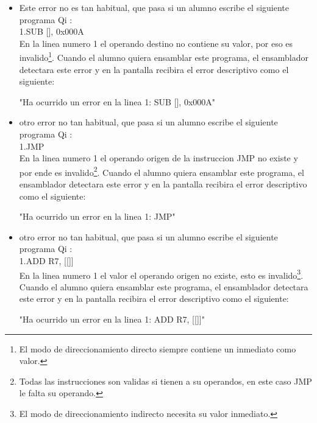 \begin{itemize}
"Ha ocurrido un error en la linea 1: ZDD [0x900000000000], R4" \\

\item Este error no es tan habitual, que pasa si un alumno escribe el siguiente programa Qi  :\\

1.SUB [], 0x000A \\

En la linea numero 1 el operando destino no contiene su valor, por eso es invalido\footnote{El modo de direccionamiento directo siempre contiene un inmediato como valor.}. Cuando el alumno quiera ensamblar este programa, el ensamblador detectara este error y en la pantalla recibira el error descriptivo como el siguiente:

"Ha ocurrido un error en la linea 1: SUB [], 0x000A" \\

\item otro error no tan habitual, que pasa si un alumno escribe el siguiente programa Qi  :\\

1.JMP \\

En la linea numero 1 el operando origen de la instruccion JMP no existe y por ende es invalido\footnote{Todas las instrucciones son validas si tienen a su operandos, en este caso JMP le falta su operando.}. Cuando el alumno quiera ensamblar este programa, el ensamblador detectara este error y en la pantalla recibira el error descriptivo como el siguiente:

"Ha ocurrido un error en la linea 1: JMP" \\
 
\item otro error no tan habitual, que pasa si un alumno escribe el siguiente programa Qi  :\\

1.ADD R7, [[]] \\

En la linea numero 1 el valor el operando origen no existe, esto es invalido\footnote{El modo de direccionamiento indirecto necesita su valor inmediato.}. Cuando el alumno quiera ensamblar este programa, el ensamblador detectara este error y en la pantalla recibira el error descriptivo como el siguiente:

"Ha ocurrido un error en la linea 1: ADD R7, [[]]" \\

\end{itemize}

